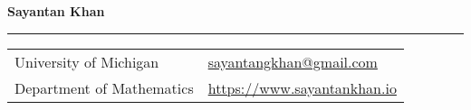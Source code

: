 \documentclass[letterpaper,11pt,oneside]{article}
\begin{document}

\noindent  \LARGE{\textbf{Sayantan Khan}} \\
\vspace{-2ex}
\hrule
\normalsize


\begin{center}
\begin{tabular}{l l}
 University of Michigan   & \hspace{1in} \href{mailto:sayantangkhan@gmail.com}{sayantangkhan@gmail.com} \\
 Department of Mathematics    & \hspace{1in}  \href{www.sayantankhan.io}{https://www.sayantankhan.io}   \\
\end{tabular}
\end{center}

\vspace{0.5em}

\end{document}
